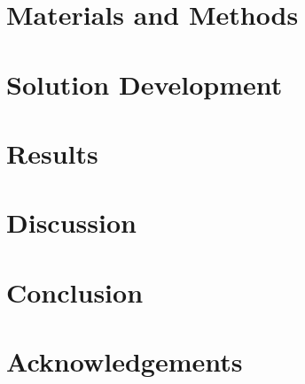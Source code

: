 \documentclass[english, a4paper, 12pt, twoside]{article}
\numberwithin{equation}{section} %
\begin{document}
%     
  
\section{Materials and Methods}\label{sec:materials_and_methods}
    
\clearpage

\section{Solution Development}
    
\clearpage

\section{Results}
    
\clearpage

\section{Discussion}
    
\clearpage

\section{Conclusion}
    
\clearpage

\section{Acknowledgements}
    
\clearpage

%     



\newpage
\printglossary[type=\acronymtype, title=List of Abbreviations]

\newpage
\renewcommand\refname{References} %
{ %
}

\newpage
\renewcommand{\appendixpagename}{Appendix} %
\renewcommand{\appendixtocname}{Appendix} %
\appendixpage 
\addappheadtotoc

\begin{appendices}
    
\end{appendices}
\end{document}
